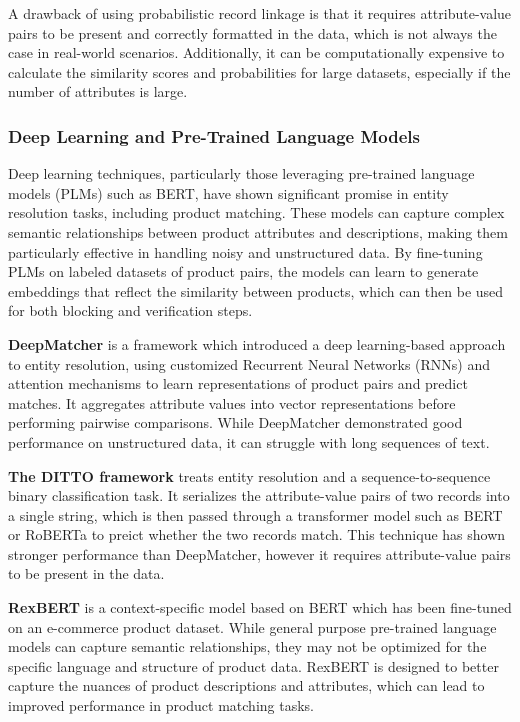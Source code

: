 A drawback of using probabilistic record linkage is that it requires attribute-value pairs to be present and correctly formatted in the data, which is not always the case in real-world scenarios.
Additionally, it can be computationally expensive to calculate the similarity scores and probabilities for large datasets, especially if the number of attributes is large.

\subsubsection{Deep Learning and Pre-Trained Language Models}\label{subsubsec:deep_learning}

Deep learning techniques, particularly those leveraging pre-trained language models (PLMs) such as BERT, have shown significant promise in entity resolution tasks, including product matching.
These models can capture complex semantic relationships between product attributes and descriptions, making them particularly effective in handling noisy and unstructured data.
By fine-tuning PLMs on labeled datasets of product pairs, the models can learn to generate embeddings that reflect the similarity between products, which can then be used for both blocking and verification steps.

\textbf{DeepMatcher}\cite{xie2024deepmatcher} is a framework which introduced a deep learning-based approach to entity resolution, using customized Recurrent Neural Networks (RNNs) and attention mechanisms to learn representations of product pairs and predict matches.
It aggregates attribute values into vector representations before performing pairwise comparisons.
While DeepMatcher demonstrated good performance on unstructured data, it can struggle with long sequences of text.

\textbf{The DITTO framework}\cite{li2020deep} treats entity resolution and a sequence-to-sequence binary classification task.
It serializes the attribute-value pairs of two records into a single string, which is then passed through a transformer model such as BERT or RoBERTa to preict whether the two records match.
This technique has shown stronger performance than DeepMatcher, however it requires attribute-value pairs to be present in the data.

\textbf{RexBERT}\cite{bajaj2026rexbert} is a context-specific model based on BERT which has been fine-tuned on an e-commerce product dataset.
While general purpose pre-trained language models can capture semantic relationships, they may not be optimized for the specific language and structure of product data.
RexBERT is designed to better capture the nuances of product descriptions and attributes, which can lead to improved performance in product matching tasks.

